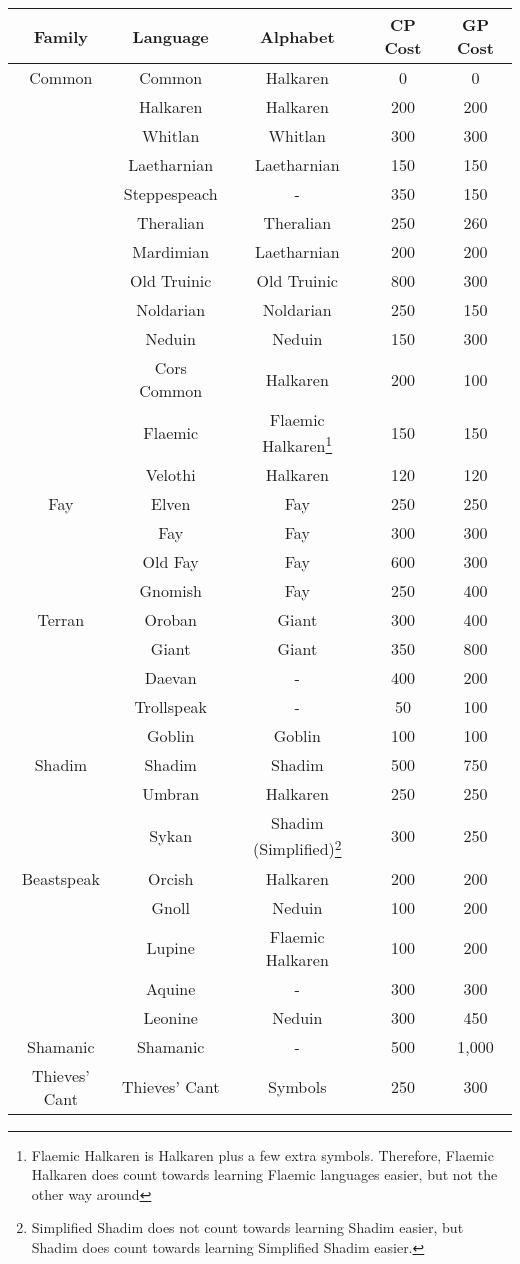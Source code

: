 \begin{longtable}{c | c | c | c | c}
	Family & Language & Alphabet & CP Cost & GP Cost\\
	\hline
	Common & Common & Halkaren & 0 & 0\\
	\cline{2-5}
	& Halkaren & Halkaren & 200 & 200\\
	& Whitlan & Whitlan & 300 & 300\\
	& Laetharnian & Laetharnian & 150 & 150\\
	& Steppespeach & - & 350 & 150\\
	& Theralian & Theralian & 250 & 260\\
	& Mardimian & Laetharnian & 200 & 200\\
	& Old Truinic & Old Truinic & 800 & 300\\
	& Noldarian & Noldarian & 250 & 150\\
	& Neduin & Neduin & 150 & 300\\
	& Cors Common & Halkaren & 200 & 100\\
	& Flaemic & Flaemic Halkaren\footnote{Flaemic Halkaren is Halkaren plus a few extra symbols. Therefore, Flaemic Halkaren does count towards learning Flaemic languages easier, but not the other way around} & 150 & 150\\
	& Velothi & Halkaren & 120 & 120\\
	Fay & Elven & Fay & 250 & 250\\
	& Fay & Fay & 300 & 300\\
	& Old Fay & Fay & 600 & 300\\
	& Gnomish & Fay & 250 & 400\\
	Terran & Oroban & Giant & 300 & 400\\
	& Giant & Giant & 350 & 800\\
	& Daevan & - & 400 & 200\\
	& Trollspeak & - & 50 & 100\\
	& Goblin & Goblin & 100 & 100\\
	Shadim & Shadim & Shadim & 500 & 750\\
	& Umbran & Halkaren & 250 & 250\\
	& Sykan & Shadim (Simplified)\footnote{Simplified Shadim does not count towards learning Shadim easier, but Shadim does count towards learning Simplified Shadim easier.} & 300 & 250\\
	Beastspeak & Orcish & Halkaren & 200 & 200\\
	& Gnoll & Neduin & 100 & 200\\
	& Lupine & Flaemic Halkaren & 100 & 200\\
	& Aquine & - & 300 & 300\\
	& Leonine & Neduin & 300 & 450\\
	Shamanic & Shamanic & - & 500 & 1,000\\
	Thieves' Cant & Thieves' Cant & Symbols & 250 & 300\\
	 
\end{longtable}